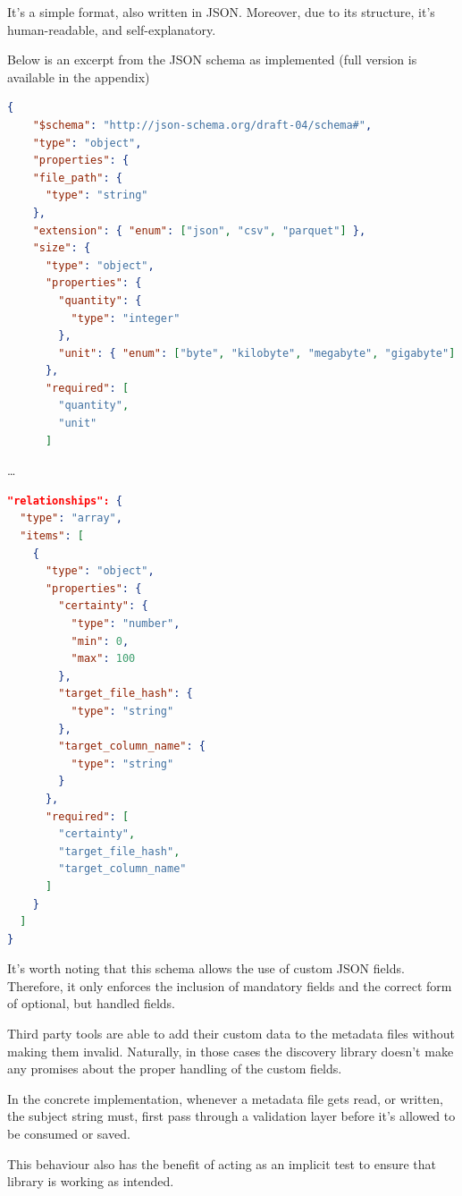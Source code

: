 It's a simple format, also written in JSON. Moreover, due to its structure, it's human-readable, and self-explanatory.

Below is an excerpt from the JSON schema as implemented (full version is available in the appendix)
\begin{lstlisting}[language=json,firstnumber=1]
{
    "$schema": "http://json-schema.org/draft-04/schema#",
    "type": "object",
    "properties": {
    "file_path": {
      "type": "string"
    },
    "extension": { "enum": ["json", "csv", "parquet"] },
    "size": {
      "type": "object",
      "properties": {
        "quantity": {
          "type": "integer"
        },
        "unit": { "enum": ["byte", "kilobyte", "megabyte", "gigabyte"] }
      },
      "required": [
        "quantity",
        "unit"
      ]
\end{lstlisting}
\ldots
\begin{lstlisting}[language=json,firstnumber=1]
"relationships": {
  "type": "array",
  "items": [
    {
      "type": "object",
      "properties": {
        "certainty": {
          "type": "number",
          "min": 0,
          "max": 100
        },
        "target_file_hash": {
          "type": "string"
        },
        "target_column_name": {
          "type": "string"
        }
      },
      "required": [
        "certainty",
        "target_file_hash",
        "target_column_name"
      ]
    }
  ]
}
\end{lstlisting}

It's worth noting that this schema allows the use of custom JSON fields.
Therefore, it only enforces the inclusion of mandatory fields and the correct form of optional,
but handled fields.

Third party tools are able to add their custom data to the metadata files without making them invalid.
Naturally, in those cases the discovery library doesn't make any promises
about the proper handling of the custom fields.

In the concrete implementation, whenever a metadata file gets read, or written, the
subject string must, first pass through a validation layer before it's allowed to be consumed
or saved.

This behaviour also has the benefit of acting as an implicit test to ensure that library is working
as intended.